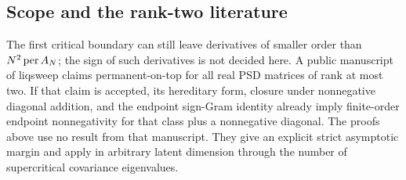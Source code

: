\subsection{Scope and the rank-two literature}\label{sp:prior}

The first critical boundary can still leave derivatives of smaller
order than \(N^2\operatorname{per} A_N\); the sign of such derivatives is not
decided here. A public manuscript of liqsweep
\cite{Liqsweep2026} claims permanent-on-top for all real PSD matrices
of rank at most two. If that claim is accepted, its hereditary form,
closure under nonnegative diagonal addition, and the endpoint
sign-Gram identity already imply finite-order endpoint nonnegativity
for that class plus a nonnegative diagonal. The proofs above use no
result from that manuscript. They give an explicit strict asymptotic
margin and apply in arbitrary latent dimension through the number of
supercritical covariance eigenvalues.
